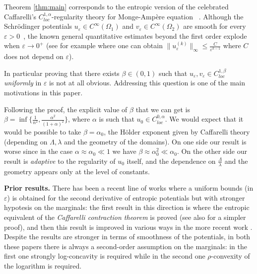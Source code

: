\documentclass[reqno,12pt]{article}
\begin{document}
Theorem \ref{thm:main} corresponds to the entropic version of the celebrated   Caffarelli's $C^{1,\alpha}_{loc}$-regularity theory for Monge-Amp\`{e}re equation ~\cite{Ca2, Ca3}. Although the Schr\"odinger potentials $u_{\varepsilon} \in C^{\infty}(\Omega_{1})$ and $v_{\varepsilon} \in C^{\infty}(\Omega_{2})$ are smooth for every $\varepsilon > 0$~\cite{DG20, genevay18sample}, the known general quantitative estimates beyond the first order explode when $\varepsilon \to 0^{+}$ (see for example \cite{genevay18sample} where one can obtain $\|u_{\varepsilon}^{(k)}\|_{\infty} \leqslant \frac C{\varepsilon^{k-1}}$ where $C$ does not depend on $\varepsilon$). 

 In particular proving that there exists $\beta \in (0,1)$ such that  $u_{\varepsilon}, v_{\varepsilon} \in C^{1,\beta}_{loc}$ \emph{uniformly} in $\varepsilon$ is not at all obvious. Addressing this question is one of the main motivations in this paper.

\begin{oss} Following the proof, the explicit value of $\beta$ that we can get is $\beta= \inf \{ \frac 1{n^2}, \frac{\alpha^2}{(1+\alpha)^2} \}$, where $\alpha$ is such that $u_0 \in C^{0,\alpha}_{loc}$.
We would expect that it would be possible to take $\beta=\alpha_0$, the H\"{o}lder exponent given by Caffarelli theory (depending on $\Lambda, \lambda$ and the geometry of the domains). On one side our result is worse since in the case $\alpha \approx \alpha_0 \ll 1$ we have $ \beta \approx \alpha_0^2 \ll \alpha_0$. On the other side our result is \emph{adaptive} to the regularity of $u_0$ itself, and the dependence on $\frac{\Lambda}{\lambda}$ and the geometry appears only at the level of constants.
\vspace{2mm}
\end{oss}


\noindent
\textbf{Prior results.} There has been a recent line of works where a uniform bounds (in $\varepsilon$) is obtained for the second derivative of entropic potentials but with stronger hypotesis on the marginals: the first result in this direction is \cite{fathi2020proof} where the entropic equivalent of the \emph{Caffarelli contraction theorem} is proved (see also \cite{chewi2023entropic} for a simpler proof), and then this result is improved in various ways in the more recent work \cite{gozlan2025global}.
Despite the results are stronger in terms of smoothness of the potentials, in both these papers there is always a second-order assumption on the marginals: in the first one strongly log-concavity is required while in the second one $\rho$-convexity of the logarithm is required.
\end{document}
